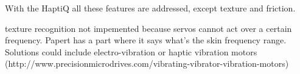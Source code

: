 With the HaptiQ all these features are addressed, except texture and friction. 

texture recognition not impemented because servos cannot act over a certain frequency. Papert \cite{brown2005first} has a part where it says what's the skin frequency range. Solutions could include electro-vibration or haptic vibration motors (http://www.precisionmicrodrives.com/vibrating-vibrator-vibration-motors)
